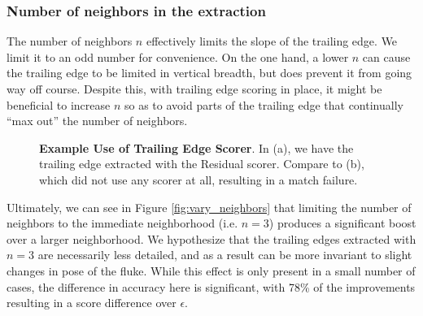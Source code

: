 \subsubsection{Number of neighbors in the extraction}

The number of neighbors $n$ effectively limits the slope of the trailing edge.
We limit it to an odd number for convenience.
On the one hand, a lower $n$ can cause the trailing edge to be limited in vertical breadth, but does prevent it from going way off course.
Despite this, with trailing edge scoring in place, it might be beneficial to increase $n$ so as to avoid parts of the trailing edge that continually ``max out'' the number of neighbors.

\begin{figure}[t]%
\centering
{}
\newline
{}
\caption{\textbf{Example Use of Trailing Edge Scorer}. In (a), we have the trailing edge extracted with the Residual scorer. Compare to (b), which did not use any scorer at all, resulting in a match failure.}
\label{fig:dis_te_use}
\end{figure}

Ultimately, we can see in Figure \ref{fig:vary_neighbors} that limiting the number of neighbors to the immediate neighborhood (i.e. $n = 3$) produces a significant boost over a larger neighborhood.
We hypothesize that the trailing edges extracted with $n = 3$ are necessarily less detailed, and as a result can be more invariant to slight changes in pose of the fluke.
While this effect is only present in a small number of cases, the difference in accuracy here is significant, with 78\% of the improvements resulting in a score difference over $\epsilon$.

